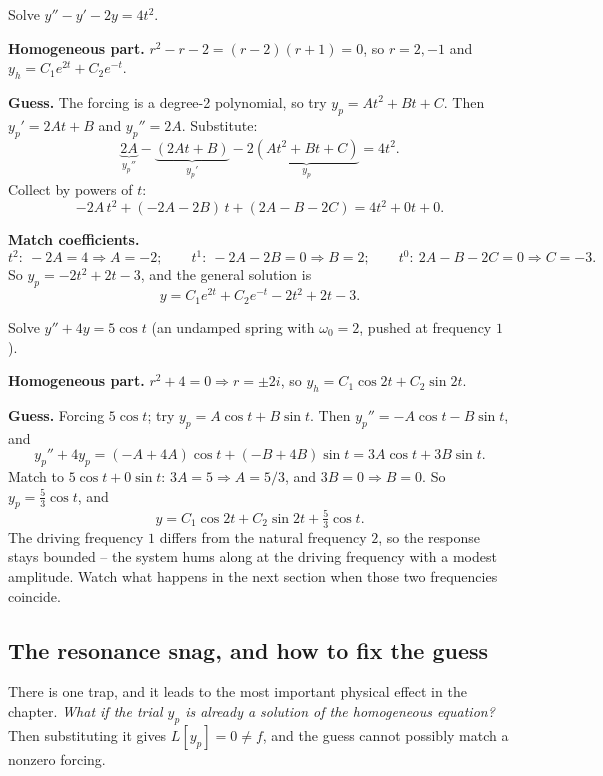 \begin{example}
\label{ch38:ex-undetermined-poly}
Solve $y'' - y' - 2y = 4t^2$.

\textbf{Homogeneous part.} $r^2 - r - 2 = (r-2)(r+1) = 0$, so $r = 2, -1$ and
$y_h = C_1 e^{2t} + C_2 e^{-t}$.

\textbf{Guess.} The forcing is a degree-2 polynomial, so try $y_p = A t^2 + B t +
C$. Then $y_p' = 2At + B$ and $y_p'' = 2A$. Substitute:
\[
  \underbrace{2A}_{y_p''} - \underbrace{(2At + B)}_{y_p'} - 2\underbrace{(At^2 + Bt + C)}_{y_p}
  = 4t^2.
\]
Collect by powers of $t$:
\[
  -2A\,t^2 + (-2A - 2B)\,t + (2A - B - 2C) = 4t^2 + 0t + 0.
\]

\textbf{Match coefficients.}
\[
  t^2:\ -2A = 4 \Rightarrow A = -2; \qquad
  t^1:\ -2A - 2B = 0 \Rightarrow B = 2; \qquad
  t^0:\ 2A - B - 2C = 0 \Rightarrow C = -3.
\]
So $y_p = -2t^2 + 2t - 3$, and the general solution is
\[
  y = C_1 e^{2t} + C_2 e^{-t} - 2t^2 + 2t - 3.
\]
\end{example}

\begin{example}
\label{ch38:ex-undetermined-sin}
Solve $y'' + 4y = 5\cos t$ (an undamped spring with $\omega_0 = 2$, pushed at
frequency $1$).

\textbf{Homogeneous part.} $r^2 + 4 = 0 \Rightarrow r = \pm 2i$, so $y_h = C_1
\cos 2t + C_2 \sin 2t$.

\textbf{Guess.} Forcing $5\cos t$; try $y_p = A\cos t + B\sin t$. Then $y_p'' =
-A\cos t - B\sin t$, and
\[
  y_p'' + 4 y_p = (-A + 4A)\cos t + (-B + 4B)\sin t = 3A\cos t + 3B\sin t.
\]
Match to $5\cos t + 0\sin t$: $3A = 5 \Rightarrow A = 5/3$, and $3B = 0 \Rightarrow
B = 0$. So $y_p = \tfrac53 \cos t$, and
\[
  y = C_1 \cos 2t + C_2 \sin 2t + \tfrac{5}{3}\cos t.
\]
The driving frequency $1$ differs from the natural frequency $2$, so the response
stays bounded -- the system hums along at the driving frequency with a
modest amplitude. Watch what happens in the next section when those two
frequencies coincide.
\end{example}

\subsection*{The resonance snag, and how to fix the guess}

There is one trap, and it leads to the most important physical effect in the
chapter. \emph{What if the trial $y_p$ is already a solution of the homogeneous
equation?} Then substituting it gives $L[y_p] = 0 \neq f$, and the guess cannot
possibly match a nonzero forcing.

